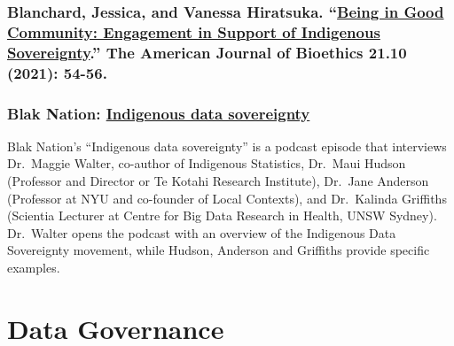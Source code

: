 \documentclass[
]{book}
\begin{document}
\hypertarget{blanchard-jessica-and-vanessa-hiratsuka.-being-in-good-community-engagement-in-support-of-indigenous-sovereignty.-the-american-journal-of-bioethics-21.10-2021-54-56.}{%
\subsubsection*{\texorpdfstring{Blanchard, Jessica, and Vanessa Hiratsuka. ``\href{https://www.tandfonline.com/doi/full/10.1080/15265161.2021.1965243}{Being in Good Community: Engagement in Support of Indigenous Sovereignty}.'' The American Journal of Bioethics 21.10 (2021): 54-56.}{Blanchard, Jessica, and Vanessa Hiratsuka. ``Being in Good Community: Engagement in Support of Indigenous Sovereignty.'' The American Journal of Bioethics 21.10 (2021): 54-56.}}\label{blanchard-jessica-and-vanessa-hiratsuka.-being-in-good-community-engagement-in-support-of-indigenous-sovereignty.-the-american-journal-of-bioethics-21.10-2021-54-56.}}

\hypertarget{blak-nation-indigenous-data-sovereignty}{%
\subsubsection*{\texorpdfstring{Blak Nation: \href{https://open.spotify.com/episode/3T7XBXU28bghKTPlowEuHL?si=SbeZZ12FQrSC0zbNkt4REA\&nd=1}{Indigenous data sovereignty}}{Blak Nation: Indigenous data sovereignty}}\label{blak-nation-indigenous-data-sovereignty}}

Blak Nation's ``Indigenous data sovereignty'' is a podcast episode that interviews Dr.~Maggie Walter, co-author of Indigenous Statistics, Dr.~Maui Hudson (Professor and Director or Te Kotahi Research Institute), Dr.~Jane Anderson (Professor at NYU and co-founder of Local Contexts), and Dr.~Kalinda Griffiths (Scientia Lecturer at Centre for Big Data Research in Health, UNSW Sydney). Dr.~Walter opens the podcast with an overview of the Indigenous Data Sovereignty movement, while Hudson, Anderson and Griffiths provide specific examples.

\hypertarget{data-governance}{%
\section{Data Governance}\label{data-governance}}
\end{document}
